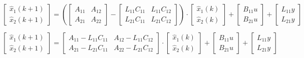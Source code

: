 \begin{equation}
    \begin{bmatrix}
        \hat{x}_1(k+1) \\
        \hat{x}_2(k+1)
    \end{bmatrix}
    =
    \left(
        \begin{bmatrix}
            A_{11} & A_{12} \\
            A_{21} & A_{22}
        \end{bmatrix}
        -
        \begin{bmatrix}
            L_{11} C_{11} & L_{11} C_{12}\\
            L_{21} C_{11} & L_{21} C_{12}
        \end{bmatrix}    
    \right)
    \cdot
    \begin{bmatrix}
        \hat{x}_1(k) \\
        \hat{x}_2(k)
    \end{bmatrix}
    +
    \begin{bmatrix}
        B_{11} u \\
        B_{21} u
    \end{bmatrix}
    +
    \begin{bmatrix}
        L_{11} y\\
        L_{21} y
    \end{bmatrix}
\end{equation}

\begin{equation}
    \begin{bmatrix}
        \hat{x}_1(k+1) \\
        \hat{x}_2(k+1)
    \end{bmatrix}
    =
    \begin{bmatrix}
        A_{11} - L_{11} C_{11} & A_{12} - L_{11} C_{12} \\
        A_{21} - L_{21} C_{11} & A_{22} - L_{21} C_{12}
    \end{bmatrix}
    \cdot
    \begin{bmatrix}
        \hat{x}_1(k) \\
        \hat{x}_2(k)
    \end{bmatrix}
    +
    \begin{bmatrix}
        B_{11} u \\
        B_{21} u
    \end{bmatrix}
    +
    \begin{bmatrix}
        L_{11} y\\
        L_{21} y
    \end{bmatrix}
\end{equation}
\vspace{-0.5cm}

